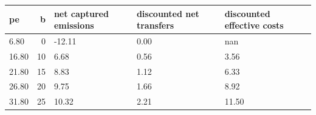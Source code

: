 \begin{tabular}{lrlll}
\toprule
pe & b & net captured emissions & discounted net transfers & discounted effective costs \\
\midrule
6.80 & 0 & -12.11 & 0.00 & nan \\
16.80 & 10 & 6.68 & 0.56 & 3.56 \\
21.80 & 15 & 8.83 & 1.12 & 6.33 \\
26.80 & 20 & 9.75 & 1.66 & 8.92 \\
31.80 & 25 & 10.32 & 2.21 & 11.50 \\
\bottomrule
\end{tabular}
